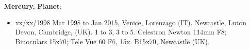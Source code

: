 {\bf Mercury, Planet}:
\begin{itemize}
\item xx/xx/1998 Mar 1998 to Jan 2015, Venice, Lorenzago (IT). Newcastle, Luton Devon, Cambridge, (UK). 1 to 3, 3 to 5. Celestron Newton 114mm F8; Binoculars 15x70; Tele Vue 60 F6, 15x. B15x70, Newcastle (UK).
\end{itemize}
